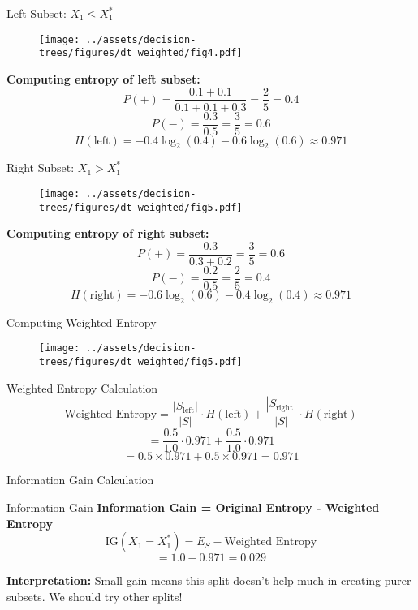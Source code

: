 \documentclass[usenames,dvipsnames]{beamer}
\begin{document}
\begin{frame}{Left Subset: $X_1 \leq X_1^*$}
\begin{figure}
    \centering
    \texttt{[image: ../assets/decision-trees/figures/dt\_weighted/fig4.pdf]}
\end{figure}
\textbf{Computing entropy of left subset:}
$$P(+) = \frac{0.1 + 0.1}{0.1 + 0.1 + 0.3} = \frac{2}{5} = 0.4$$
$$P(-) = \frac{0.3}{0.5} = \frac{3}{5} = 0.6$$
$$H(\text{left}) = -0.4 \log_2(0.4) - 0.6 \log_2(0.6) \approx 0.971$$
\end{frame}
	
\begin{frame}{Right Subset: $X_1 > X_1^*$}
\begin{figure}
    \centering
    \texttt{[image: ../assets/decision-trees/figures/dt\_weighted/fig5.pdf]}
\end{figure}
\textbf{Computing entropy of right subset:}
$$P(+) = \frac{0.3}{0.3 + 0.2} = \frac{3}{5} = 0.6$$
$$P(-) = \frac{0.2}{0.5} = \frac{2}{5} = 0.4$$
$$H(\text{right}) = -0.6 \log_2(0.6) - 0.4 \log_2(0.4) \approx 0.971$$
\end{frame}
	
\begin{frame}{Computing Weighted Entropy}
\begin{figure}
    \centering
    \texttt{[image: ../assets/decision-trees/figures/dt\_weighted/fig5.pdf]}
\end{figure}
\scriptsize
\begin{examplebox}{Weighted Entropy Calculation}
$$\text{Weighted Entropy} = \frac{|S_{\text{left}}|}{|S|} \cdot H(\text{left}) + \frac{|S_{\text{right}}|}{|S|} \cdot H(\text{right})$$
$$= \frac{0.5}{1.0} \cdot 0.971 + \frac{0.5}{1.0} \cdot 0.971$$
$$= 0.5 \times 0.971 + 0.5 \times 0.971 = 0.971$$
\end{examplebox}
\end{frame}

\begin{frame}{Information Gain Calculation}
    \scriptsize
\begin{keypointsbox}{Information Gain}
\textbf{Information Gain = Original Entropy - Weighted Entropy}
$$\text{IG}(X_1 = X_1^*) = E_S - \text{Weighted Entropy}$$
$$= 1.0 - 0.971 = 0.029$$
\end{keypointsbox}
\textbf{Interpretation:} Small gain means this split doesn't help much in creating purer subsets. We should try other splits!
\end{frame}
\end{document}

